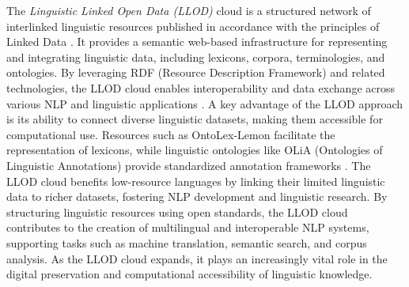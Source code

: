 \documentclass[11pt]{article}
\begin{document}
The \emph{Linguistic Linked Open Data (LLOD)} cloud is a structured network of interlinked linguistic resources published in accordance with the principles of Linked Data \cite{bizer2009linked}. It provides a semantic web-based infrastructure for representing and integrating linguistic data, including lexicons, corpora, terminologies, and ontologies. By leveraging RDF (Resource Description Framework) and related technologies, the LLOD cloud enables interoperability and data exchange across various NLP and linguistic applications \cite{chiarcos2013linguistic}.  A key advantage of the LLOD approach is its ability to connect diverse linguistic datasets, making them accessible for computational use. Resources such as OntoLex-Lemon facilitate the representation of lexicons, while linguistic ontologies like OLiA (Ontologies of Linguistic Annotations) provide standardized annotation frameworks \cite{chiarcos2012olia}. The LLOD cloud benefits low-resource languages by linking their limited linguistic data to richer datasets, fostering NLP development and linguistic research. By structuring linguistic resources using open standards, the LLOD cloud contributes to the creation of multilingual and interoperable NLP systems, supporting tasks such as machine translation, semantic search, and corpus analysis. As the LLOD cloud expands, it plays an increasingly vital role in the digital preservation and computational accessibility of linguistic knowledge.  




\end{document}
